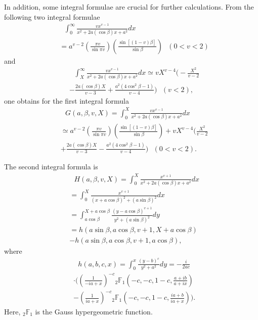 \documentclass[a4paper,10pt,twoside]{cpc-hepnp}
\begin{document}
\begin{CJK*}{UTF8}{gbsn}
\begin{small}
\begin{multicols}{2}
		In addition, some integral formulae are crucial for further calculations. From the following two integral formulae
		\begin{align}
			&\ \ \  \int_0^{\infty} \frac{vx^{v-1}}{x^2+2a(\cos\beta) x+a^2} dx \nonumber \\
			& = a^{v-2} \left(\frac{\pi v}{\sin\pi v}\right) \left(\frac{\sin[(1-v)\beta]}{\sin\beta}\right) \ \ \ (0<v<2)
		\end{align}
		and
		\begin{align}
			&\ \ \  \int_{X}^{\infty} \frac{vx^{v-1}}{x^2+2a(\cos\beta) x+a^2} dx \simeq v X^{v-4} \Bigg(-\frac{X^2}{v-2} \nonumber \\
			& - \frac{2a(\cos\beta) X}{v-3}+\frac{a^2(4\cos^2\beta-1)}{v-4}\Bigg) \ \ \ (v<2),
		\end{align}
		one obtains for the first integral formula
		\begin{align}
			&\ \ \  G(a,\beta,v,X) = \int_{0}^{X} \frac{vx^{v-1}}{x^2+2a(\cos\beta) x+a^2} dx \nonumber \\
			& \simeq a^{v-2} \left(\frac{\pi v}{\sin\pi v}\right) \left(\frac{\sin[(1-v)\beta]}{\sin\beta}\right) + v X^{v-4} \bigg(\frac{X^2}{v-2} \nonumber \\
			& +\frac{2a(\cos\beta) X}{v-3}-\frac{a^2(4\cos^2\beta-1)}{v-4}\bigg) \ \ \ (0<v<2).
		\end{align}
		
		The second integral formula is
		\begin{align}
			&\ \ \  H(a,\beta,v,X) = \int_{0}^{X} \frac{x^{v+1}}{x^2+2a(\cos\beta) x+a^2} dx \nonumber \\
			& = \int_{0}^{X} \frac{x^{v+1}}{(x+a\cos\beta)^2+(a\sin\beta)^2} dx \nonumber \\
			& = \int_{a\cos\beta}^{X+a\cos\beta} \frac{(y-a\cos\beta)^{v+1}}{y^2+(a\sin\beta)^2} dy \nonumber \\
			& = h(a\sin\beta,a\cos\beta,v+1,X+a\cos\beta) \nonumber \\
			& - h(a\sin\beta,a\cos\beta,v+1,a\cos\beta),
		\end{align}
		where
		\begin{align}
			&\ \ \  h(a,b,c,x) = \int_0^x \frac{(y-b)^c}{y^2+a^2} dy = -\frac{i}{2ac} \nonumber \\
			& \cdot \Bigg(\left(\frac{1}{-ia+x}\right)^{-c}{}_2\mathbb{F}_1\left(-c,-c,1-c,\frac{a+ib}{a+ix}\right) \nonumber \\
			& - \left(\frac{1}{ia+x}\right)^{-c}{}_2\mathbb{F}_1\left(-c,-c,1-c,\frac{ia+b}{ia+x}\right)\Bigg).
		\end{align}
		Here, ${}_2\mathbb{F}_1$ is the Gauss hypergeometric function.
		

\end{multicols}
\end{small}
\end{CJK*}
\end{document}
